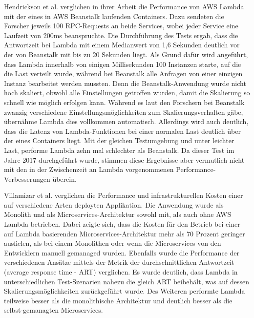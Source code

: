 Hendrickson et al. verglichen in ihrer Arbeit die Performance von \ac{AWS} Lambda mit der eines in \ac{AWS} Beanstalk laufenden Containers\cite{hendrickson_serverless_2017}. Dazu sendeten die Forscher jeweils 100 RPC-Requests an beide Services, wobei jeder Service eine Laufzeit von 200ms beanspruchte. Die Durchführung des Tests ergab, dass die Antwortzeit bei Lambda mit einem Medianwert von 1,6 Sekunden deutlich vor der von Beanstalk mit bis zu 20 Sekunden liegt. Als Grund dafür wird angeführt, dass Lambda innerhalb von einigen Millisekunden 100 Instanzen starte, auf die die Last verteilt wurde, während bei Beanstalk alle Anfragen von einer einzigen Instanz bearbeitet werden mussten. Denn die Beanstalk-Anwendung wurde nicht hoch skaliert, obwohl alle Einstellungen getroffen wurden, damit die Skalierung so schnell wie möglich erfolgen kann. Während es laut den Forschern bei Beanstalk zwanzig verschiedene Einstellungsmöglichkeiten zum Skalierungsverhalten gäbe, übernähme Lambda dies vollkommen automatisch.
Allerdings wird auch deutlich, dass die Latenz von Lambda-Funktionen bei einer normalen Last deutlich über der eines Containers liegt. Mit der gleichen Testumgebung und unter leichter Last, performe Lambda zehn mal schlechter als Beanstalk. Da dieser Test im Jahre 2017 durchgeführt wurde, stimmen diese Ergebnisse aber vermutlich nicht mit den in der Zwischenzeit an Lambda vorgenommenen Performance-Verbesserungen überein.

Villamizar et al. verglichen die Performance und infrastrukturellen Kosten einer auf verschiedene Arten deployten Applikation\cite{villamizar_infrastructure_2016}. Die Anwendung wurde als Monolith und als Microservices-Architektur sowohl mit, als auch ohne \ac{AWS} Lambda betrieben. Dabei zeigte sich, dass die Kosten für den Betrieb bei einer auf Lambda basierenden Microservices-Architektur mehr als 70 Prozent geringer ausfielen, als bei einem Monolithen oder wenn die Microservices von den Entwicklern manuell gemanaged wurden. Ebenfalls wurde die Performance der verschiedenen Ansätze mittels der Metrik der durchschnittlichen Antwortzeit (average response time - ART) verglichen. Es wurde deutlich, dass Lambda in unterschiedlichen Test-Szenarien nahezu die gleich ART beibehält, was auf dessen Skalierungsmöglichkeiten zurückgeführt wurde. Des Weiteren performte Lambda teilweise besser als die monolithische Architektur und deutlich besser als die selbst-gemanagten Microservices.

